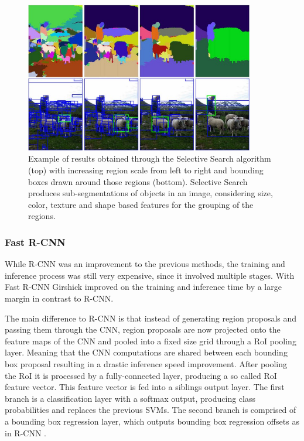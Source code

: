 \begin{figure}
\begin{center}
    \includegraphics[width=10cm]{imgs/selective_search.png}
    \caption{Example of results obtained through the Selective Search algorithm (top) with increasing region scale from left to right and bounding boxes drawn around those regions (bottom). Selective Search produces sub-segmentations of objects in an image, considering size, color, texture and shape based features for the grouping of the regions.   \cite{selective_search}}
    \label{fig:selective_search}
\end{center}
\end{figure}

\subsubsection{Fast R-CNN}
While \ac{R-CNN} was an improvement to the previous methods, the training and inference process was still very expensive, since it involved multiple stages.
With Fast R-CNN Girshick \cite{fast_rcnn} improved on the training and inference time by a large margin in contrast to \ac{R-CNN}.

The main difference to \ac{R-CNN} is that instead of generating region proposals and passing them through the \ac{CNN}, region proposals are now projected onto the feature maps of the \ac{CNN} and pooled into a fixed size grid through a \ac{RoI} pooling layer.
Meaning that the \ac{CNN} computations are shared between each bounding box proposal resulting in a drastic inference speed improvement.
After pooling the \ac{RoI} it is processed by a fully-connected layer, producing a so called \ac{RoI} feature vector.
This feature vector is fed into a siblings output layer.
The first branch is a classification layer with a softmax output, producing class probabilities and replaces the previous \acp{SVM}.
The second branch is comprised of a bounding box regression layer, which outputs bounding box regression offsets as in \ac{R-CNN} \cite{rcnn}.

